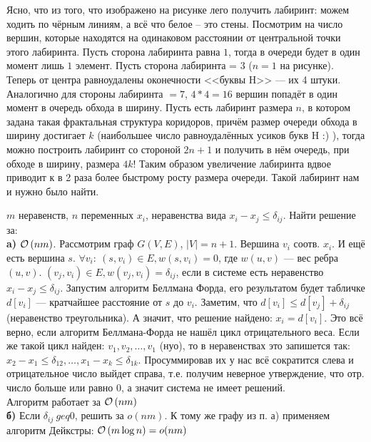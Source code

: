 Ясно, что из того, что изображено на рисунке лего получить лабиринт: можем ходить по чёрным линиям, а всё что белое -- это стены. Посмотрим на число вершин, которые находятся на одинаковом
расстоянии от центральной точки этого лабиринта. Пусть сторона лабиринта равна $1$, 
тогда в очереди будет в один момент лишь $1$ элемент. Пусть сторона лабиринта = $3$ ($n=1$ на рисунке). Теперь от центра равноудалены оконечности <<буквы H>> --- их 4 штуки. Аналогично
для стороны лабиринта $=7$, $4*4=16$ вершин попадёт в один
момент в очередь обхода в ширину. Пусть есть лабиринт размера $n$, в котором задана такая фрактальная структура коридоров, причём
размер очереди обхода в ширину достигает $k$ (наибольшее число равноудалённых усиков букв H :) ), тогда можно построить лабиринт со стороной $2n+1$ и получить в нём очередь, при обходе в ширину, размера $4k$! Таким образом увеличение лабиринта вдвое приводит к в 2 раза более быстрому росту размера очереди. Такой лабиринт нам и нужно было найти. \xqed 


$m$ неравенств, $n$ переменных $x_i$, неравенства вида $x_i - x_j \leq \delta_{ij}$. Найти решение за:\\
\textbf{a)} $\mathcal{O}\left(nm\right)$. Рассмотрим граф $G(V,E)$, $|V| = n + 1$. Вершина $v_i$ соотв. $x_i$. И ещё есть вершина $s$. $\forall v_i:\ (s,v_i) \in E, w(s,v_i) = 0$, где $w(u,v)$ --- вес ребра $(u,v)$.
$(v_j, v_i)\in E, w(v_j,v_i) = \delta_{ij}$, если в системе есть неравенство $x_i-x_j\leq \delta_{ij}$. Запустим алгоритм Беллмана Форда, его результатом будет табличке $d[v_i]$ --- кратчайшее расстояние от $s$ до $v_i$. Заметим, что $d[v_i] \leq d[v_j] + \delta_{ij}$ (неравенство треугольника). А значит, что решение найдено: $x_i = d[v_i]$. Это всё верно, если алгоритм Беллмана-Форда не нашёл цикл отрицательного веса. Если же такой цикл найден: $v_1,v_2,\ldots,v_1$ (нуо), то в неравенствах это запишется так: $x_2 - x_1 \leq \delta_{12},\ldots,x_1-x_k \leq \delta_{1k}$. Просуммировав их у нас всё сократится слева и отрицательное число выйдет справа, т.е. получим неверное утверждение, что отр. число больше или равно 0, а значит система не имеет решений.\\
Алгоритм работает за $\mathcal{O}\left(nm\right)$\\
\textbf{б)} Если $\delta_{ij}\ geq 0$, решить за $o(nm)$. К тому же графу из п. а) применяем алгоритм Дейкстры: $\mathcal{O}\left(m\log n\right) = o(nm)$  \xqed
 
